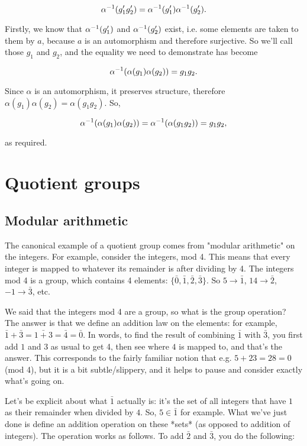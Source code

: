 $$
\alpha^{-1}(g_1'g_2') = \alpha^{-1}(g_1')\alpha^{-1}(g_2').
$$


Firstly, we know that $\alpha^{-1}(g_1')$ and $\alpha^{-1}(g_2')$ exist, i.e. some elements
are taken to them by $a$, because $a$ is an automorphism and therefore
surjective. So we'll call those $g_1$ and $g_2$, and the equality we need to
demonstrate has become

$$
\alpha^{-1}(\alpha(g_1)\alpha(g_2)) = g_1g_2.
$$

Since $\alpha$ is an automorphism, it preserves structure, therefore
$\alpha(g_1)\alpha(g_2) = \alpha(g_1g_2)$. So,

$$
\alpha^{-1}(\alpha(g_1)\alpha(g_2)) = \alpha^{-1}(\alpha(g_1g_2)) = g_1g_2,
$$

as required.
\newcommand{\textstack}[2]{
  \left(\begin{array}{c}
    \text{#1}  \\
    \text{#2}
  \end{array}\right)
}

\section{Quotient groups}
\subsection{Modular arithmetic}

The canonical example of a quotient group comes from "modular arithmetic" on
the integers. For example, consider the integers, mod 4. This means that every
integer is mapped to whatever its remainder is after dividing by 4. The
integers mod 4 is a group, which contains 4 elements: $\{\bar 0, \bar 1, \bar
2, \bar 3\}$. So $5 \rightarrow \bar 1$, $14 \rightarrow \bar 2$, $-1
\rightarrow \bar 3$, etc.

We said that the integers mod 4 are a group, so what is the group operation?
The answer is that we define an addition law on the elements: for example,
$\bar 1 + \bar 3 = \bar{1 + 3} = \bar 4 = \bar 0$. In words, to find the result
of combining $\bar 1$ with $\bar 3$, you first add $1$ and $3$ as usual to get
4, then see where $4$ is mapped to, and that's the answer. This corresponds to
the fairly familiar notion that e.g. $5 + 23 = 28 = 0$ (mod 4), but it is a bit
subtle/slippery, and it helps to pause and consider exactly what's going on.

Let's be explicit about what $\bar 1$ actually is: it's the set of all integers
that have $1$ as their remainder when divided by $4$. So, $5 \in \bar 1$ for
example. What we've just done is define an addition operation on these *sets*
(as opposed to addition of integers). The operation works as follows. To add
$\bar 2$ and $\bar 3$, you do the following:

